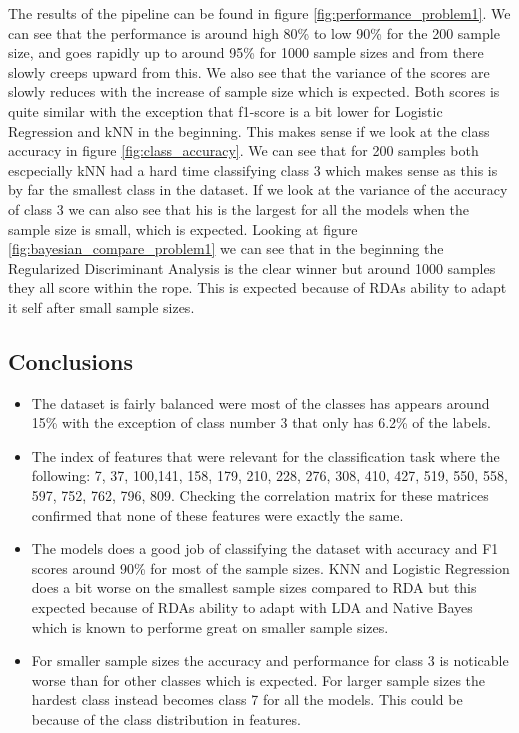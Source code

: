 \documentclass[11pt]{article}
\begin{document}
The results of the pipeline can be found in figure \ref{fig:performance_problem1}. We can see that the performance is around high 80\% to low 90\% for the 200 sample size, and goes rapidly up to around 95\% for 1000 sample sizes and from there slowly creeps upward from this. We also see that the variance of the scores are slowly reduces with the increase of sample size which is expected. Both scores is quite similar with the exception that f1-score is a bit lower for Logistic Regression and kNN in the beginning. This makes sense if we look at the class accuracy in figure \ref{fig:class_accuracy}. We can see that for 200 samples both escpecially kNN had a hard time classifying class 3 which makes sense as this is by far the smallest class in the dataset. If we look at the variance of the accuracy of class 3 we can also see that his is the largest for all the models when the sample size is small, which is expected. Looking at figure \ref{fig:bayesian_compare_problem1} we can see that in the beginning the Regularized Discriminant Analysis is the clear winner but around 1000 samples they all score within the rope. This is expected because of RDAs ability to adapt it self after small sample sizes.
\newpage

\subsection{Conclusions}
\begin{itemize}
	\item The dataset is fairly balanced were most of the classes has appears around 15\% with the exception of class number 3 that only has 6.2\% of the labels.

	\item The index of features that were relevant for the classification task where the following: 7, 37, 100,141, 158, 179, 210, 228, 276, 308, 410, 427, 519, 550, 558, 597, 752, 762, 796, 809. Checking the correlation matrix for these matrices confirmed that none of these features were exactly the same.
	\item The models does a good job of classifying the dataset with accuracy and F1 scores around 90\% for most of the sample sizes. KNN and Logistic Regression does a bit worse on the smallest sample sizes compared to RDA but this expected because of RDAs ability to adapt with LDA and Native Bayes which is known to performe great on smaller sample sizes.
	\item For smaller sample sizes the accuracy and performance for class 3 is noticable worse than for other classes which is expected. For larger sample sizes the hardest class instead becomes class 7 for all the models. This could be because of the class distribution in features.

\end{itemize}
\end{document}
